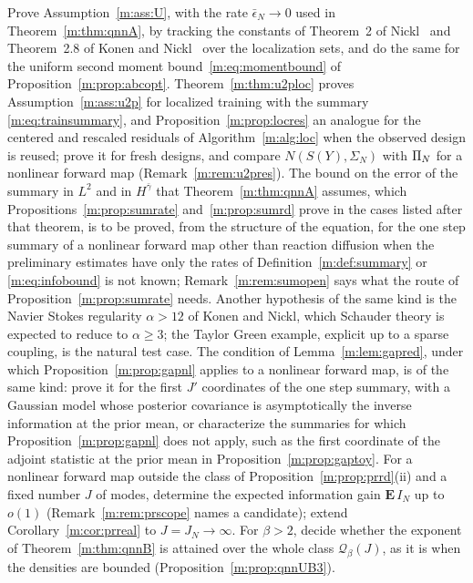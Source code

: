 \begin{openquestion}[Uniformity]\label{m:op:unif}
Prove Assumption~\ref{m:ass:U}, with the rate $\bar\epsilon_N\to0$ used in Theorem~\ref{m:thm:qnnA}, by tracking the constants of Theorem~2 of Nickl~\cite{nicklbvm2024} and Theorem~2.8 of Konen and Nickl~\cite{konennickl2026} over the localization sets, and do the same for the uniform second moment bound~\eqref{m:eq:momentbound} of Proposition~\ref{m:prop:abcopt}. Theorem~\ref{m:thm:u2ploc} proves Assumption~\ref{m:ass:u2p} for localized training with the summary \eqref{m:eq:trainsummary}, and Proposition~\ref{m:prop:locres} an analogue for the centered and rescaled residuals of Algorithm~\ref{m:alg:loc} when the observed design is reused; prove it for fresh designs, and compare $N(S(Y),\Sigma_N)$ with $\Pi_N$ for a nonlinear forward map (Remark~\ref{m:rem:u2pres}). The bound on the error of the summary in $L^2$ and in $H^{\bar\gamma}$ that Theorem~\ref{m:thm:qnnA} assumes, which Propositions~\ref{m:prop:sumrate} and~\ref{m:prop:sumrd} prove in the cases listed after that theorem, is to be proved, from the structure of the equation, for the one step summary of a nonlinear forward map other than reaction diffusion when the preliminary estimates have only the rates of Definition~\ref{m:def:summary} or \eqref{m:eq:infobound} is not known; Remark~\ref{m:rem:sumopen} says what the route of Proposition~\ref{m:prop:sumrate} needs. Another hypothesis of the same kind is the Navier Stokes regularity $\alpha>12$ of Konen and Nickl, which Schauder theory is expected to reduce to $\alpha\ge3$; the Taylor Green example, explicit up to a sparse coupling, is the natural test case. The condition of Lemma~\ref{m:lem:gapred}, under which Proposition~\ref{m:prop:gapnl} applies to a nonlinear forward map, is of the same kind: prove it for the first $J'$ coordinates of the one step summary, with a Gaussian model whose posterior covariance is asymptotically the inverse information at the prior mean, or characterize the summaries for which Proposition~\ref{m:prop:gapnl} does not apply, such as the first coordinate of the adjoint statistic at the prior mean in Proposition~\ref{m:prop:gaptoy}. For a nonlinear forward map outside the class of Proposition~\ref{m:prop:prrd}(ii) and a fixed number $J$ of modes, determine the expected information gain $\mathbf E\,I_N$ up to $o(1)$ (Remark~\ref{m:rem:prscope} names a candidate); extend Corollary~\ref{m:cor:prreal} to $J=J_N\to\infty$. For $\beta>2$, decide whether the exponent of Theorem~\ref{m:thm:qnnB} is attained over the whole class $\mathcal Q_\beta(J)$, as it is when the densities are bounded (Proposition~\ref{m:prop:qnnUB3}).
\end{openquestion}

